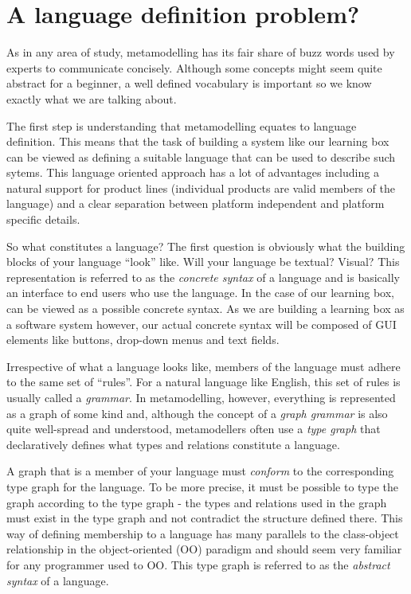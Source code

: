 
\chapter{A language definition problem?}

As in any area of study, metamodelling has its fair share of buzz words used by experts to communicate concisely.  Although some concepts might seem quite
abstract for a beginner, a well defined vocabulary is important so we know exactly what we are talking about.

The first step is understanding that metamodelling equates to language definition. This means that the task of building a system like our learning box can be  
viewed as defining a suitable language that can be used to describe such sytems. This language oriented approach has a lot of advantages including a natural
support for product lines (individual products are valid members of the language) and a clear separation between platform independent and platform specific details.

So what constitutes a language?  The first question is obviously what the building blocks of your language ``look'' like. Will your language be textual? Visual?
 This representation is referred to as the \emph{concrete syntax} of a language and is basically an interface to end users who use the
language. In the case of our learning box,  can be viewed as a possible concrete syntax. As we are building a learning box
as a software system however, our actual concrete syntax will be composed of GUI elements like buttons, drop-down menus and text fields.

Irrespective of what a language looks like, members of the language must adhere to the same set of ``rules''. For a natural language like
English, this set of rules is usually called a \emph{grammar}. In metamodelling, however, everything is represented as a graph of some kind and,
although the concept of a \emph{graph grammar} is also quite well-spread and understood, metamodellers often use a \emph{type
graph} that declaratively defines what types and relations constitute a language.

A graph that is a member of your language must \emph{conform} to the corresponding type graph for the language. To be more precise, it must be possible to
type the graph according to the type graph - the types and relations used in the graph must exist in the type graph and not contradict the structure defined there.
This way of defining membership to a language has many parallels to the class-object relationship in the object-oriented (OO) paradigm and
should seem very familiar for any programmer used to OO. This type graph is referred to as the \emph{abstract syntax} of a language.

